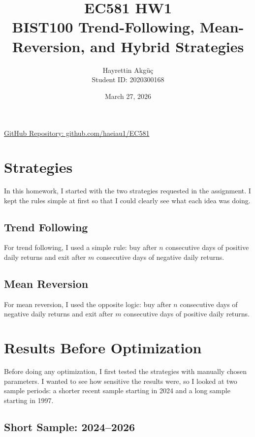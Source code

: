 \documentclass[11pt]{article}
\title{EC581 HW1\\BIST100 Trend-Following, Mean-Reversion, and Hybrid Strategies}
\author{Hayrettin Akgüç \\ Student ID: 2020300168}
\date{March 27, 2026}
\begin{document}
\maketitle

\begin{center}
\href{https://github.com/haeiau1/EC581}{GitHub Repository: github.com/haeiau1/EC581}
\end{center}

\section{Strategies}
In this homework, I started with the two strategies requested in the assignment. I kept the rules simple at first so that I could clearly see what each idea was doing.

\subsection{Trend Following}
For trend following, I used a simple rule: buy after $n$ consecutive days of positive daily returns and exit after $m$ consecutive days of negative daily returns.

\subsection{Mean Reversion}
For mean reversion, I used the opposite logic: buy after $n$ consecutive days of negative daily returns and exit after $m$ consecutive days of positive daily returns.

\section{Results Before Optimization}
Before doing any optimization, I first tested the strategies with manually chosen parameters. I wanted to see how sensitive the results were, so I looked at two sample periods: a shorter recent sample starting in 2024 and a long sample starting in 1997.

\subsection{Short Sample: 2024--2026}
\begin{table}[H]
\centering
\caption{Manual Results for the 2024--2026 Sample}
\label{tab:manual_2024}
\end{table}
\end{document}
